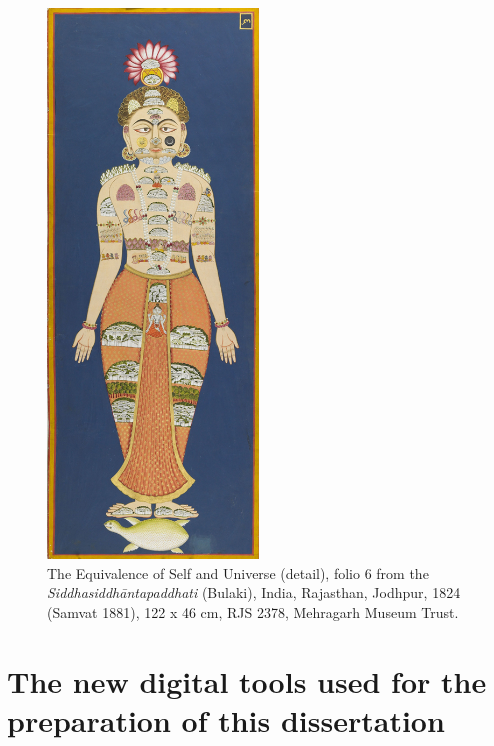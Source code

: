 \clearpage
  \begin{figure}[ht]
	\centering
  \includegraphics[width=0.5\textwidth]{pics/The_Equivalence_of_Self_and_Universe_(detail),_folio_6_from_the_Siddha_Siddhanta_Paddhati,_(Bulaki),_1824_(Samvat_1881);_122_x_46_cm._Mehrangarh_Museum_Trust..jpg}
	\caption{The Equivalence of Self and Universe (detail), folio 6 from the \textit{Siddhasiddhāntapaddhati} (Bulaki), India, Rajasthan, Jodhpur, 1824 (Samvat 1881), 122 x 46 cm, RJS 2378, Mehragarh Museum Trust.}
	\label{fig2}
      \end{figure}

\section{The new digital tools used for the preparation of this dissertation}

